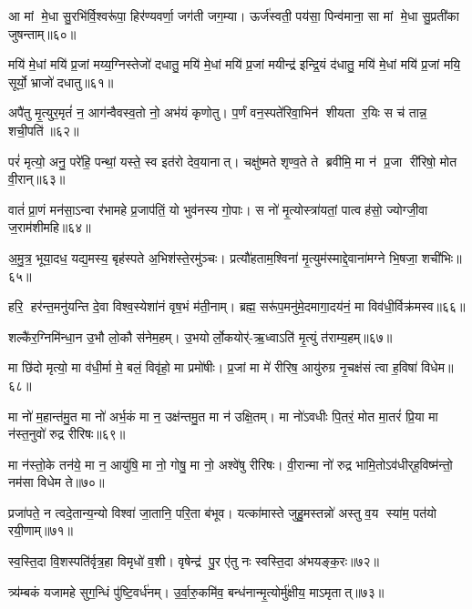 आ मां मे॒धा सु॒रभि॑र्वि॒श्वरू॑पा॒ हिर॑ण्यवर्णा॒ जग॑ती जग॒म्या। ऊर्ज॑स्वती॒ पय॑सा॒ पिन्व॑माना॒ सा मां मे॒धा सु॒प्रती॑का जुषन्ताम्॥६०॥ \anuvakamend

मयि॑ मे॒धां मयि॑ प्र॒जां मय्य॒ग्निस्तेजो॑ दधातु॒ मयि॑ मे॒धां मयि॑ प्र॒जां मयीन्द्र॑ इन्द्रि॒यं द॑धातु॒ मयि॑ मे॒धां मयि॑ प्र॒जां मयि॒ सूर्यो॒ भ्राजो॑ दधातु॥६१॥ \anuvakamend


अपै॑तु मृ॒त्युर॒मृतं॑ न॒ आग॑न्वैवस्व॒तो नो॒ अभ॑यं कृणोतु। प॒र्णं वन॒स्पते॑रिवा॒भिन॑ शीयता र॒यिः स च॑ तान्न॒ शची॒पति॑॥६२॥%
\anuvakamend

 परं॑ मृत्यो॒ अनु॒ परे॑हि॒ पन्थां॒ यस्ते॒ स्व इत॑रो देव॒यानात्। चक्षु॑ष्मते शृण्व॒ते ते ब्रवीमि॒ मा न॑ प्र॒जा री॑रिषो॒ मोत वी॒रान्॥६३॥
 \anuvakamend
 
 वातं॑ प्रा॒णं मन॑सा॒ऽन्वा र॑भामहे प्र॒जाप॑तिं॒ यो भुव॑नस्य गो॒पाः। स नो॑ मृ॒त्योस्त्रा॑यतां॒ पात्वह॑सो॒ ज्योग्जी॒वा ज॒राम॑शीमहि॥६४॥
 \anuvakamend
 
 अ॒मु॒त्र॒ भूया॒दध॒ यद्य॒मस्य॒ बृह॑स्पते अ॒भिश॑स्ते॒रमु॑ञ्चः। प्रत्यौ॑हताम॒श्विना॑ मृ॒त्युम॑स्माद्दे॒वाना॑मग्ने भि॒षजा॒ शची॑भिः॥६५॥
 \anuvakamend
 
 हरि॒ हर॑न्त॒मनु॑यन्ति दे॒वा विश्व॒स्येशा॑नं वृष॒भं म॑ती॒नाम्। ब्रह्म॒ सरू॑प॒मनु॑मे॒दमागा॒दय॑नं॒ मा विव॑धी॒र्विक्र॑मस्व॥६६॥
 \anuvakamend
 
 शल्कै॑र॒ग्निमि॑न्धा॒न उ॒भौ लो॒कौ स॑नेम॒हम्। उ॒भयोर्लो॒कयोर्॑-ऋ॒ध्वाऽति॑ मृ॒त्युं त॑राम्य॒हम्॥६७॥
\anuvakamend
 
मा छि॑दो मृत्यो॒ मा व॑धी॒र्मा मे॒ बलं॒ विवृ॑हो॒ मा प्रमो॑षीः। प्र॒जां मा मे॑ रीरिष॒ आयु॑रुग्र नृ॒चक्ष॑सं त्वा ह॒विषा॑ विधेम॥६८॥
\anuvakamend
 
मा नो॑ म॒हान्त॑मु॒त मा नो॑ अर्भ॒कं मा न॒ उक्ष॑न्तमु॒त मा न॑ उक्षि॒तम्। मा नो॑ऽवधीः पि॒तरं॒ मोत मा॒तरं॑ प्रि॒या मा न॑स्त॒नुवो॑ रुद्र रीरिषः॥६९॥
\anuvakamend

मा न॑स्तो॒के तन॑ये॒ मा न॒ आयु॑षि॒ मा नो॒ गोषु॒ मा नो॒ अश्वे॑षु रीरिषः। वी॒रान्मा नो॑ रुद्र भामि॒तोऽव॑धीर्‌ह॒विष्म॑न्तो॒ नम॑सा विधेम ते॥७०॥
\anuvakamend 

प्रजा॑पते॒ न त्वदे॒तान्य॒न्यो विश्वा॑ जा॒तानि॒ परि॒ता ब॑भूव। यत्का॑मास्ते जुहु॒मस्तन्नो॑ अस्तु व॒य स्या॑म॒ पत॑यो रयी॒णाम्॥७१॥
\anuvakamend 

स्व॒स्ति॒दा वि॒शस्पति॑र्वृत्र॒हा विमृधो॑ व॒शी। वृषेन्द्र॑ पु॒र ए॑तु नः स्वस्ति॒दा अ॑भयङ्क॒रः॥७२॥
\anuvakamend 

त्र्य॑म्बकं यजामहे सुग॒न्धिं पु॑ष्टि॒वर्ध॑नम्। उ॒र्वा॒रु॒कमि॑व॒ बन्ध॑नान्मृ॒त्योर्मु॑क्षीय॒ माऽमृतात्॥७३॥
\anuvakamend 


